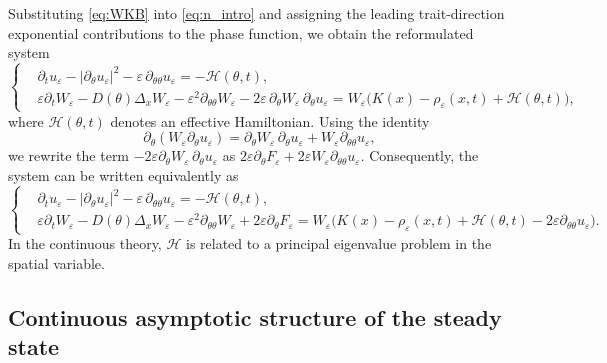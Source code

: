\documentclass[11pt]{article}
\begin{document}
Substituting \eqref{eq:WKB} into \eqref{eq:n_intro} and assigning the leading trait-direction exponential contributions to the phase function, we obtain the reformulated system
\begin{equation}\label{eq:WKB_reformulation0}
\left\{
\begin{aligned}
& \partial_t u_\varepsilon
- |\partial_\theta u_\varepsilon|^2
- \varepsilon \, \partial_{\theta\theta} u_\varepsilon
= - \mathcal H(\theta,t), \\
& \varepsilon \partial_t W_\varepsilon
- D(\theta)\Delta_x W_\varepsilon
- \varepsilon^2 \partial_{\theta\theta} W_\varepsilon
- 2\varepsilon \, \partial_\theta W_\varepsilon \, \partial_\theta u_\varepsilon
= W_\varepsilon\bigl(K(x)-\rho_\varepsilon(x,t)+\mathcal H(\theta,t)\bigr),
\end{aligned}
\right.
\end{equation}
where \(\mathcal H(\theta,t)\) denotes an effective Hamiltonian. 
Using the identity
\[
\partial_\theta(W_\varepsilon\partial_\theta u_\varepsilon)
=
\partial_\theta W_\varepsilon\,\partial_\theta u_\varepsilon
+
W_\varepsilon\partial_{\theta\theta}u_\varepsilon,
\]
we rewrite the term  $-2\varepsilon\partial_\theta W_\varepsilon\,\partial_\theta u_\varepsilon$ as $2\varepsilon\partial_\theta F_\varepsilon+2\varepsilon W_\varepsilon\partial_{\theta\theta}u_\varepsilon$. 
Consequently, the system can be written equivalently as
\begin{equation}\label{eq:WKB_reformulation}
\left\{
\begin{aligned}
& \partial_t u_\varepsilon
- |\partial_\theta u_\varepsilon|^2
- \varepsilon \, \partial_{\theta\theta} u_\varepsilon
= - \mathcal H(\theta,t), \\
& \varepsilon \partial_t W_\varepsilon
- D(\theta)\Delta_x W_\varepsilon
- \varepsilon^2 \partial_{\theta\theta} W_\varepsilon
+2\varepsilon\partial_\theta F_\varepsilon
=
W_\varepsilon
\bigl(
K(x)-\rho_\varepsilon(x,t)
+\mathcal H(\theta,t)
-2\varepsilon\partial_{\theta\theta}u_\varepsilon
\bigr).
\end{aligned}
\right.
\end{equation}
In the continuous theory, \(\mathcal H\) is related to a principal eigenvalue problem in the spatial variable. 


\subsection{Continuous asymptotic structure of the steady state}\label{subsec:continuous_asymptotic_structure}
\end{document}

